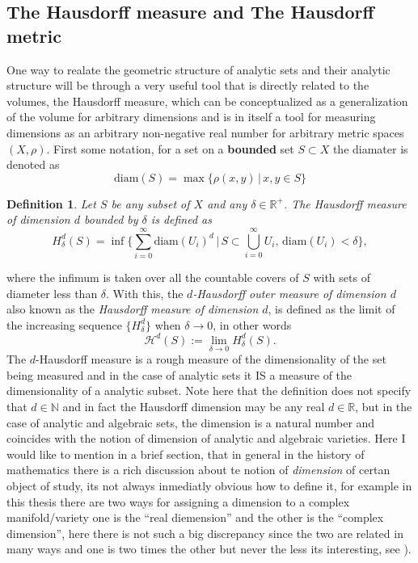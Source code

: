 \documentclass[12pt,twoside,a4paper]{report}
\newtheorem{definition}{Definition}[section]
\newcommand{\nat}{\ensuremath{ \mathbb N }}
\newcommand{\re}{\ensuremath{\mathbb R }}
\begin{document}
\subsection{The Hausdorff measure and The Hausdorff metric}
\noindent One way to realate the geometric structure of analytic sets and their analytic structure will be through a very useful tool that is directly related to the volumes, the Hausdorff measure, which can be conceptualized as a generalization of the volume for arbitrary dimensions and is in itself a tool for measuring dimensions as an arbitrary non-negative real number for arbitrary metric spaces $(X,\rho)$. First some notation, for a set on a \textbf{bounded} set $S\subset X$ the diamater is denoted as
\[
\textrm{diam}(S)=\max\{\rho(x,y)\,|\,x,y\in S\}
\]
\begin{definition}
Let $S$ be any subset of $X$ and any $\delta\in\re^{+}$. The Hausdorff measure of dimension $d$ bounded by $\delta$ is defined as
\[
H_{\delta}^{d}(S)=\inf\Big\{\sum_{i=0}^{\infty}\textrm{diam}(U_i)^{d}\,|\,S\subset\bigcup_{i=0}^{\infty}U_i,\,\textrm{diam}(U_i)<\delta\Big\},
\]
\end{definition}
\noindent where the infimum is taken over all the countable covers of $S$ with sets of diameter less than $\delta$. With this, the \emph{$d$-Hausdorff outer measure of dimension $d$} also known as the \emph{Hausdorff measure of dimension $d$}, is defined as the limit of the increasing sequence $\{H_{\delta}^d\}$ when $\delta\rightarrow 0$, in other words
\[
\mathcal{H}^d(S):=\lim_{\delta\rightarrow 0}H_{\delta}^d(S).
\]
The $d$-Hausdorff measure is a rough measure of the dimensionality of the set being measured and in the case of analytic sets it IS a measure of the dimensionality of a analytic subset. Note here that the definition does not specify that $d\in\nat$ and in fact the Hausdorff dimension may be any real $d\in\re$, but in the case of analytic and algebraic sets, the dimension is a natural number and coincides with the notion of dimension of analytic and algebraic varieties. Here I would like to mention in a brief section, that in general in the history of mathematics there is a rich discussion about te notion of \emph{dimension} of certan object of study, its not always inmediatly obvious how to define it, for example in this thesis there are two ways for assigning a dimension to a complex manifold/variety one is the ``real diemension'' and the other is the ``complex dimension'', here there is not such a big discrepancy since the two are related in many ways and one is two times the other but never the less its interesting, see \cite{YURI-MANIM:ON-THE-NOTION-OF-DIMENSION..}).
\end{document}
